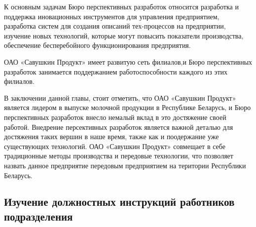 {	\par \redline К основным задачам Бюро перспективных разработок относится разработка и поддержка иновационных инструментов для управления предприятием, разработка систем для создания описаний тех-процессов на предприятии, изучение новых технологий, которые могут повысить показатели производства, обеспечение бесперебойного функционирования предприятия. 
	
	\par \redline ОАО «Савушкин Продукт» имеет развитую сеть филиалов,и Бюро перспективных разработок занимается поддержанием работоспособности каждого из этих филиалов.
	
	
	\par \redline В заключении данной главы, стоит отметить, что ОАО «Савушкин Продукт» является лидером в выпуске молочной продукции в Республике Беларусь, и Бюро перспективных разработок внесло немалый вклад в это достяжение своей работой. Внедрение персективных разработок является важной деталью для достяжения таких вершин в наше время, также как и поодержание уже существующих технологий. ОАО «Савушкин Продукт» совмещает в себе традиционные методы производства и передовые технологии, что позволяет назвать данное предприятие передовым предприятием на територии Республики Беларусь. 
	
	\par
}

\subtitlespace

\subsection*{ 
	\gostTitleFont
	 Изучение должностных инструкций работников подразделения
} 

\subtitlespace

